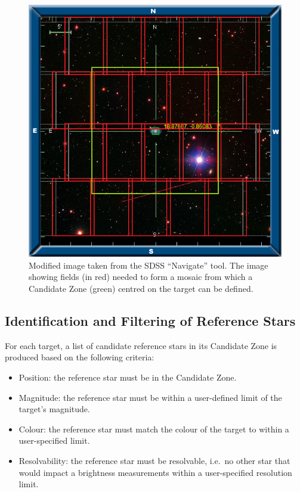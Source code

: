 \documentclass[]{elsarticle} %
\makeatletter
\providecommand{\tightlist}{%
  \setlength{\itemsep}{0pt}\setlength{\parskip}{0pt}}
\def\maxwidth{\ifdim\Gin@nat@width>\linewidth\linewidth
\else\Gin@nat@width\fi}
\let\Oldincludegraphics\includegraphics
\renewcommand{\includegraphics}[1]{\Oldincludegraphics[width=\maxwidth]{#1}}
\makeatother
\begin{document}
\begin{figure}
\centering
\includegraphics{fig2.png}
\caption{Modified image taken from the SDSS ``Navigate'' tool.
The image showing fields (in red) needed to form a mosaic from which a
Candidate Zone (green) centred on the target can be defined.}
\end{figure}

\hypertarget{identification-and-filtering-of-reference-stars}{%
\subsection{Identification and Filtering of Reference
Stars}\label{identification-and-filtering-of-reference-stars}}

For each target, a list of candidate reference stars in its Candidate
Zone is produced based on the following criteria:

\begin{itemize}
\tightlist
\item
  Position: the reference star must be in the Candidate Zone.
\item
  Magnitude: the reference star must be within a user-defined limit of
  the target's magnitude.
\item
  Colour: the reference star must match the colour of the target to
  within a user-specified limit.
\item
  Resolvability: the reference star must be resolvable, i.e.~no other
  star that would impact a brightness measurements within a
  user-specified resolution limit.
\end{itemize}
\end{document}
